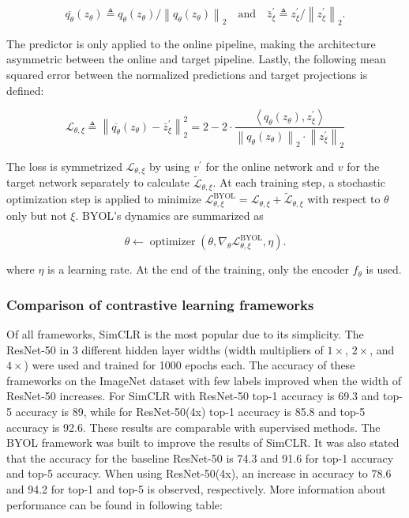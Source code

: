 \documentclass[
]{krantz}
\begin{document}
\[
\overline{q_{\theta}}\left(z_{\theta}\right) \triangleq q_{\theta}\left(z_{\theta}\right) /\left\|q_{\theta}\left(z_{\theta}\right)\right\|_{2} \quad \textrm{and} \quad
\bar{z}_{\xi}^{\prime} \triangleq z_{\xi}^{\prime} /\left\|z_{\xi}^{\prime}\right\|_{2}.
\]

The predictor is only applied to the online pipeline, making the architecture asymmetric between the online and target pipeline. Lastly, the following mean squared error between the normalized predictions and target projections is defined:

\[
\mathcal{L}_{\theta, \xi} \triangleq\left\|\overline{q_{\theta}}\left(z_{\theta}\right)-\bar{z}_{\xi}^{\prime}\right\|_{2}^{2}=2-2 \cdot \frac{\left\langle q_{\theta}\left(z_{\theta}\right), z_{\xi}^{\prime}\right\rangle}{\left\|q_{\theta}\left(z_{\theta}\right)\right\|_{2} \cdot\left\|z_{\xi}^{\prime}\right\|_{2}}
\]

The loss is symmetrized \(\mathcal{L}_{\theta, \xi}\) by using \(v^{\prime}\) for the online network and \(v\) for the target network separately to calculate \(\widetilde{\mathcal{L}}_{\theta, \xi}\). At each training step, a stochastic optimization step is applied to minimize \(\mathcal{L}_{\theta, \xi}^{\mathrm{BYOL}}=\mathcal{L}_{\theta, \xi}+\widetilde{\mathcal{L}}_{\theta, \xi}\) with respect to \(\theta\) only but not \(\xi\). BYOL's dynamics are summarized as

\[
\theta \leftarrow \operatorname{optimizer}\left(\theta, \nabla_{\theta} \mathcal{L}_{\theta, \xi}^{\mathrm{BYOL}}, \eta\right).
\]

where \(\eta\) is a learning rate. At the end of the training, only the encoder \(f_{\theta}\) is used.

\hypertarget{comparison-of-contrastive-learning-frameworks}{%
\subsubsection{Comparison of contrastive learning frameworks}\label{comparison-of-contrastive-learning-frameworks}}

Of all frameworks, SimCLR is the most popular due to its simplicity. The ResNet-50 in 3 different hidden layer widths (width multipliers of \(1\times\), \(2\times\), and \(4\times\)) were used and trained for 1000 epochs each. The accuracy of these frameworks on the ImageNet dataset with few labels improved when the width of ResNet-50 increases. For SimCLR with ResNet-50 top-1 accuracy is 69.3 and top-5 accuracy is 89, while for ResNet-50(4x) top-1 accuracy is 85.8 and top-5 accuracy is 92.6. These results are comparable with supervised methods.
The BYOL framework was built to improve the results of SimCLR. It was also stated that the accuracy for the baseline ResNet-50 is 74.3 and 91.6 for top-1 accuracy and top-5 accuracy. When using ResNet-50(4x), an increase in accuracy to 78.6 and 94.2 for top-1 and top-5 is observed, respectively. More information about performance can be found in following table:
\end{document}
